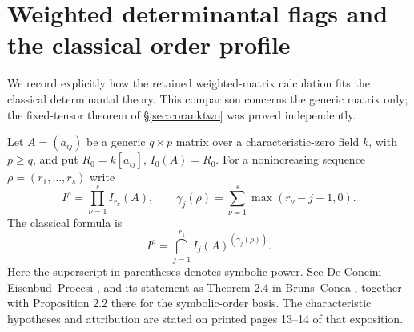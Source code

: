\section{Weighted determinantal flags and the classical order profile}
\label{sec:weighted}
We record explicitly how the retained weighted-matrix calculation
fits the classical determinantal theory. This comparison concerns the
generic matrix only; the fixed-tensor theorem of
\S\ref{sec:coranktwo} was proved independently.

Let $A=(a_{ij})$ be a generic $q\times p$ matrix over a
characteristic-zero field $k$, with $p\ge q$, and put
$R_0=k[a_{ij}]$, $I_0(A)=R_0$. For a nonincreasing sequence
$\rho=(r_1,\ldots,r_s)$ write
\[
 I^\rho=\prod_{\nu=1}^s I_{r_\nu}(A),\qquad
 \gamma_j(\rho)=\sum_{\nu=1}^s\max(r_\nu-j+1,0).
\]
The classical formula is
\begin{equation}\label{eq:classical-product}
 I^\rho=\bigcap_{j=1}^{r_1} I_j(A)^{(\gamma_j(\rho))}.
\end{equation}
Here the superscript in parentheses denotes symbolic power.
See De Concini--Eisenbud--Procesi \cite{DCEP}, and its statement as
Theorem 2.4 in Bruns--Conca \cite{BC}, together with Proposition 2.2
there for the symbolic-order basis. The characteristic hypotheses and
attribution are stated on printed pages 13--14 of that exposition.

